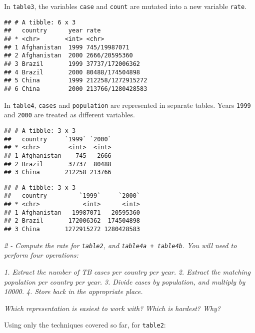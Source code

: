 \documentclass[]{article}
\theoremstyle{definition}
\theoremstyle{definition}
\theoremstyle{definition}
\theoremstyle{remark}
\begin{document}
In \texttt{table3}, the variables \texttt{case} and \texttt{count} are
mutated into a new variable \texttt{rate}.

\begin{verbatim}
## # A tibble: 6 x 3
##   country      year rate             
## * <chr>       <int> <chr>            
## 1 Afghanistan  1999 745/19987071     
## 2 Afghanistan  2000 2666/20595360    
## 3 Brazil       1999 37737/172006362  
## 4 Brazil       2000 80488/174504898  
## 5 China        1999 212258/1272915272
## 6 China        2000 213766/1280428583
\end{verbatim}

In \texttt{table4}, \texttt{cases} and \texttt{population} are
represented in separate tables. Years \texttt{1999} and \texttt{2000}
are treated as different variables.

\begin{verbatim}
## # A tibble: 3 x 3
##   country     `1999` `2000`
## * <chr>        <int>  <int>
## 1 Afghanistan    745   2666
## 2 Brazil       37737  80488
## 3 China       212258 213766
\end{verbatim}

\begin{verbatim}
## # A tibble: 3 x 3
##   country         `1999`     `2000`
## * <chr>            <int>      <int>
## 1 Afghanistan   19987071   20595360
## 2 Brazil       172006362  174504898
## 3 China       1272915272 1280428583
\end{verbatim}

\emph{2 - Compute the rate for \texttt{table2}, and
\texttt{table4a\ +\ table4b}. You will need to perform four operations:}

\emph{1. Extract the number of TB cases per country per year.} \emph{2.
Extract the matching population per country per year.} \emph{3. Divide
cases by population, and multiply by 10000.} \emph{4. Store back in the
appropriate place.}

\emph{Which representation is easiest to work with? Which is hardest?
Why?}

Using only the techniques covered so far, for \texttt{table2}:
\end{document}
